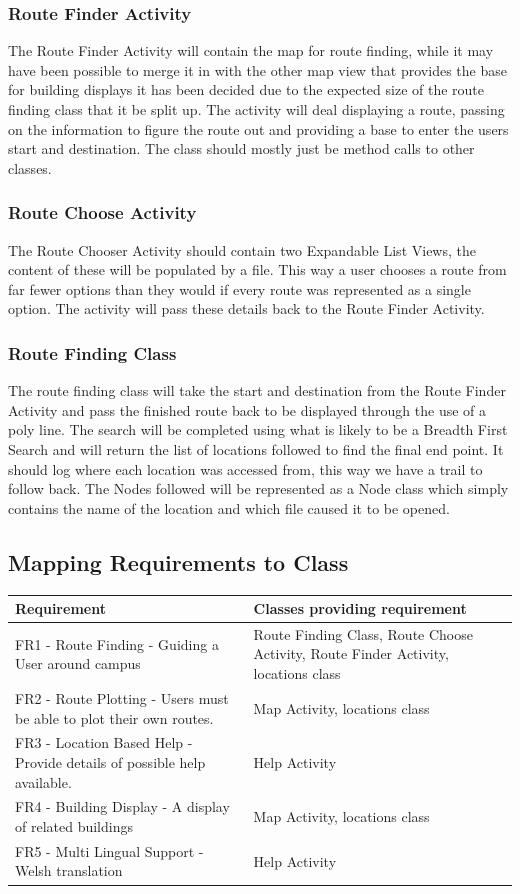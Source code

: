 \subsubsection{Route Finder Activity}
The Route Finder Activity will contain the map for route finding, while it may have been possible to merge it in with the other map view that provides the base for building displays it has been decided due to the expected size of the route finding class that it be split up. The activity will deal displaying a route, passing on the information to figure the route out and providing a base to enter the users start and destination. The class should mostly just be method calls to other classes.
\subsubsection{Route Choose Activity}
The Route Chooser Activity should contain two Expandable List Views, the content of these will be populated by a file. This way a user chooses a route from far fewer options than they would if every route was represented as a single option. The activity will pass these details back to the Route Finder Activity.
\subsubsection{Route Finding Class}
The route finding class will take the start and destination from the Route Finder Activity and pass the finished route back to be displayed through the use of a poly line. The search will be completed using what is likely to be a Breadth First Search and will return the list of locations followed to find the final end point. It should log where each location was accessed from, this way we have a trail to follow back. The Nodes followed will be represented as a Node class which simply contains the name of the location and which file caused it to be opened.
\subsection{Mapping Requirements to Class}
\begin{center}
    \begin{tabular}{ | p{7cm} | p{7cm} |}
    \hline
    Requirement & Classes providing requirement  \\ \hline
    FR1 - Route Finding - Guiding a User around campus & Route Finding Class, Route Choose Activity, Route Finder Activity, locations class  \\ \hline
    FR2 - Route Plotting - Users must be able to plot their own routes.& Map Activity, locations class  \\ \hline
   FR3 - Location Based Help - Provide details of possible help available. & Help Activity  \\ \hline
   FR4 - Building Display - A display of related buildings & Map Activity, locations class \\ \hline
   FR5 - Multi Lingual Support - Welsh translation & Help Activity \\ \hline
    \end{tabular}
\end{center}
\newpage
